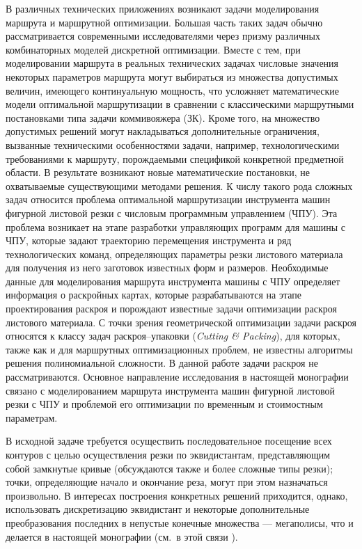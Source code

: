\documentclass[11pt,twoside,openany]{report}
\begin{document}
В различных технических приложениях
возникают задачи моделирования маршрута и маршрутной оптимизации.
Большая часть таких задач обычно рассматривается современными
исследователями через призму различных комбинаторных моделей дискретной оптимизации.
Вместе с тем, при моделировании маршрута в реальных технических задачах
числовые значения некоторых параметров маршрута могут выбираться
из множества допустимых величин, имеющего континуальную мощность,
что усложняет математические модели оптимальной маршрутизации
в сравнении с классическими маршрутными постановками типа задачи коммивояжера (ЗК).
Кроме того, на множество допустимых решений могут накладываться дополнительные ограничения,
вызванные техническими особенностями задачи, например,
технологическими требованиями к маршруту,
порождаемыми спецификой конкретной предметной области.
В результате возникают новые математические постановки,
не охватываемые существующими методами решения.
К числу такого рода сложных задач относится
проблема оптимальной маршрутизации инструмента
машин фигурной листовой резки с числовым программным управлением (ЧПУ).
Эта проблема возникает на этапе разработки управляющих программ для машины с ЧПУ,
которые задают траекторию перемещения инструмента и ряд технологических команд,
определяющих параметры резки листового материала
для получения из него заготовок известных форм и размеров.
Необходимые данные для моделирования маршрута инструмента
машины с ЧПУ определяет информация о раскройных картах,
которые разрабатываются на этапе проектирования раскроя
и порождают известные задачи оптимизации раскроя листового материала.
С точки зрения геометрической оптимизации задачи раскроя относятся
к классу задач раскроя--упаковки
(\textit{Cutting \& Packing}),
для которых, также как и для маршрутных оптимизационных проблем,
не известны алгоритмы решения полиномиальной сложности.
В данной работе задачи раскроя не рассматриваются.
Основное направление исследования в настоящей монографии
связано с моделированием маршрута инструмента
машин фигурной листовой резки с ЧПУ и
проблемой его оптимизации по временным и стоимостным параметрам.

В исходной задаче требуется осуществить последовательное
посещение всех контуров с целью осуществления резки по эквидистантам,
представляющим собой замкнутые кривые
(обсуждаются также и более сложные типы резки);
точки, определяющие начало и окончание реза,
могут при этом назначаться произвольно.
В интересах построения конкретных решений приходится,
однако, использовать дискретизацию эквидистант
и некоторые дополнительные преобразования последних в непустые конечные множества — мегаполисы,
что и делается в настоящей монографии
(см.~в этой связи \cite{intro01,intro02}).
\end{document}
